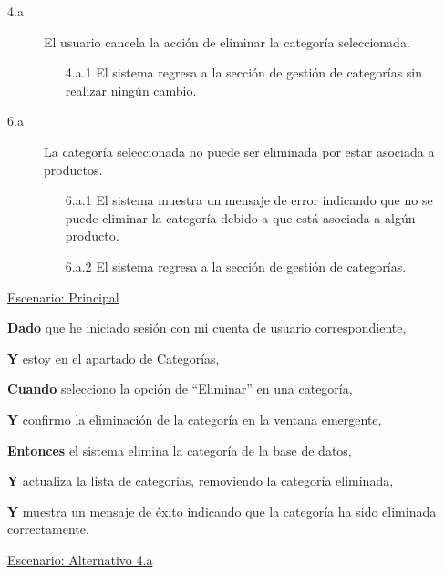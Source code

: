 \begin{description}
  
    \item[4.a] El usuario cancela la acción de eliminar la categoría seleccionada.
    \begin{enumerate}
        \item[4.a.1] El sistema regresa a la sección de gestión de categorías sin realizar ningún cambio.
    \end{enumerate}

     \item[6.a] La categoría seleccionada no puede ser eliminada por estar asociada a productos.
    \begin{enumerate}
        \item[6.a.1] El sistema muestra un mensaje de error indicando que no se puede eliminar la categoría debido a que está asociada a algún producto.
        \item[6.a.2] El sistema regresa a la sección de gestión de categorías.
    \end{enumerate}
\end{description}

\underline{Escenario: Principal}\par
\vspace{0.15cm}

\textbf{Dado} que he iniciado sesión con mi cuenta de usuario correspondiente,\par
\textbf{Y} estoy en el apartado de Categorías,\par
\textbf{Cuando} selecciono la opción de \enquote{Eliminar} en una categoría,\par
\textbf{Y} confirmo la eliminación de la categoría en la ventana emergente,\par
\textbf{Entonces} el sistema elimina la categoría de la base de datos,\par
\textbf{Y} actualiza la lista de categorías, removiendo la categoría eliminada,\par
\textbf{Y} muestra un mensaje de éxito indicando que la categoría ha sido eliminada correctamente.\par

\vspace{0.20cm}

\underline{Escenario: Alternativo 4.a}\par
\vspace{0.15cm}

